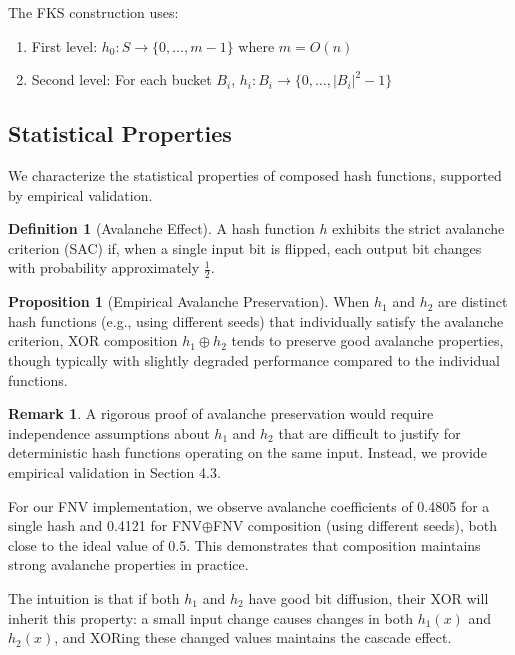 \documentclass[11pt,a4paper]{article}
\theoremstyle{definition}
\newtheorem{definition}{Definition}[section]
\newtheorem{proposition}[theorem]{Proposition}
\newtheorem{remark}{Remark}[section]
\begin{document}
The FKS construction uses:
\begin{enumerate}
    \item First level: $h_0: S \rightarrow \{0, \ldots, m-1\}$ where $m = O(n)$
    \item Second level: For each bucket $B_i$, $h_i: B_i \rightarrow \{0, \ldots, |B_i|^2-1\}$
\end{enumerate}

\subsection{Statistical Properties}

We characterize the statistical properties of composed hash functions, supported by empirical validation.

\begin{definition}[Avalanche Effect]
A hash function $h$ exhibits the strict avalanche criterion (SAC) if, when a single input bit is flipped, each output bit changes with probability approximately $\frac{1}{2}$.
\end{definition}

\begin{proposition}[Empirical Avalanche Preservation]
When $h_1$ and $h_2$ are distinct hash functions (e.g., using different seeds) that individually satisfy the avalanche criterion, XOR composition $h_1 \oplus h_2$ tends to preserve good avalanche properties, though typically with slightly degraded performance compared to the individual functions.
\end{proposition}

\begin{remark}
A rigorous proof of avalanche preservation would require independence assumptions about $h_1$ and $h_2$ that are difficult to justify for deterministic hash functions operating on the same input. Instead, we provide empirical validation in Section 4.3.

For our FNV implementation, we observe avalanche coefficients of 0.4805 for a single hash and 0.4121 for FNV$\oplus$FNV composition (using different seeds), both close to the ideal value of 0.5. This demonstrates that composition maintains strong avalanche properties in practice.

The intuition is that if both $h_1$ and $h_2$ have good bit diffusion, their XOR will inherit this property: a small input change causes changes in both $h_1(x)$ and $h_2(x)$, and XORing these changed values maintains the cascade effect.
\end{remark}
\end{document}

